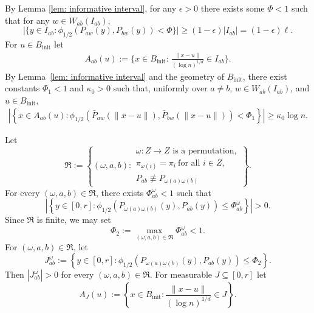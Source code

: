 \documentclass[11pt, a4paper]{amsart}
\newcommand{\1}{\mathbf{1}}
\theoremstyle{definition}
\theoremstyle{remark}
\theoremstyle{definition}
\begin{document}
By Lemma \ref{lem: informative interval}, for any $\epsilon>0$ there exists some $\Phi <1$ such that for any $w \in W_{ab}(I_{ab})$,
\[
\Big|\Big\{y \in I_{ab}: \phi_{1/2}(P_{aw}(y),P_{bw}(y)) < \Phi\Big\}\Big| \ge (1-\epsilon) |I_{ab}|=(1-\epsilon) \ell.
\]
For $u \in B_{\mathrm{init}}$ let
\begin{align}
A_{ab}(u):=\{x \in B_{\mathrm{init}}:\,\frac{\|x-u\|}{(\log n)^{1/d}} \in I_{ab}\}.\label{def:Aabu}
\end{align}
By Lemma~\ref{lem: informative interval} and the geometry of
$B_{\mathrm{init}}$, there exist constants
$\Phi_1<1$ and $\kappa_0>0$ such that, uniformly over
$a\neq b$, $w\in W_{ab}(I_{ab})$, and
$u\in B_{\mathrm{init}}$,
\begin{align}
\left|
\left\{
x\in A_{ab}(u):
\phi_{1/2}\left(
\bar P_{aw}(\|x-u\|),
\bar P_{bw}(\|x-u\|)
\right)
<\Phi_1
\right\}
\right|
\geq
\kappa_0\log n.
\label{eq:Aab-informative-volume}
\end{align}

Let
\[
\mathfrak R
:=
\left\{
(\omega,a,b):
\begin{array}{l}
\omega:Z\to Z\text{ is a permutation},\\
\pi_{\omega(i)}=\pi_i\ \text{for all }i\in Z,\\
P_{ab}\not\equiv P_{\omega(a)\omega(b)}
\end{array}
\right\}.
\]
For every $(\omega,a,b)\in\mathfrak R$, there exists
$\Phi_{ab}^{\omega}<1$ such that
\[
\left|
\left\{
y\in[0,r]:
\phi_{1/2}\left(
P_{\omega(a)\omega(b)}(y),P_{ab}(y)
\right)
\leq\Phi_{ab}^{\omega}
\right\}
\right|>0.
\]
Since $\mathfrak R$ is finite, we may set
\[
\Phi_2
:=
\max_{(\omega,a,b)\in\mathfrak R}
\Phi_{ab}^{\omega}<1.
\]
For $(\omega,a,b)\in\mathfrak R$, let
\[
J_{ab}^{\omega}
:=
\left\{
y\in[0,r]:
\phi_{1/2}\left(
P_{\omega(a)\omega(b)}(y),
P_{ab}(y)
\right)
\leq\Phi_2
\right\}.
\]
Then $|J_{ab}^{\omega}|>0$ for every
$(\omega,a,b)\in\mathfrak R$.
For measurable $J \subseteq [0,r]$ let 
\[
A_J(u)
:=
\left\{
x\in B_{\mathrm{init}}:
\frac{\|x-u\|}{(\log n)^{1/d}}\in J
\right\}.
\]
\end{document}

